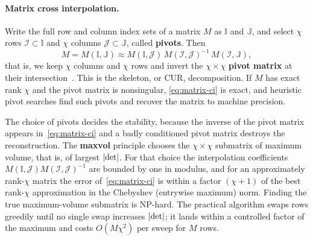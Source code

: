 \paragraph{Matrix cross interpolation.}
Write the full row and column index sets of a matrix $M$ as $\mathbb{I}$ and
$\mathbb{J}$, and select $\chi$ rows $\mathcal{I} \subset \mathbb{I}$ and $\chi$
columns $\mathcal{J} \subset \mathbb{J}$, called \textbf{pivots}. Then
\begin{equation}
  M = M(\mathbb{I}, \mathbb{J})
  \approx M(\mathbb{I}, \mathcal{J})\, M(\mathcal{I}, \mathcal{J})^{-1}\,
  M(\mathcal{I}, \mathbb{J}),
  \label{eq:matrix-ci}
\end{equation}%
that is, we keep $\chi$ columns and $\chi$ rows and invert the $\chi \times \chi$
\textbf{pivot matrix} at their intersection~\cite{Goreinov2010}. This is the
skeleton, or CUR, decomposition. If $M$ has exact rank $\chi$ and the pivot
matrix is nonsingular, \eqref{eq:matrix-ci} is exact, and heuristic pivot
searches find such pivots and recover the matrix to machine precision.

The choice of pivots decides the stability, because the inverse of the pivot
matrix appears in~\eqref{eq:matrix-ci} and a badly conditioned pivot matrix
destroys the reconstruction. The \textbf{maxvol} principle chooses the
$\chi \times \chi$ submatrix of maximum volume, that is, of largest
$\left|\det\right|$. For that choice the interpolation coefficients
$M(\mathbb{I},\mathcal{J})M(\mathcal{I},\mathcal{J})^{-1}$ are bounded by one in
modulus, and for an approximately rank-$\chi$ matrix the error
of~\eqref{eq:matrix-ci} is within a factor $(\chi+1)$ of the best rank-$\chi$
approximation in the Chebyshev (entrywise maximum) norm. Finding the true
maximum-volume submatrix is NP-hard. The practical algorithm swaps rows greedily
until no single swap increases $\left|\det\right|$; it lands within a controlled factor
of the maximum and costs $O(M\chi^2)$ per sweep for $M$ rows.

